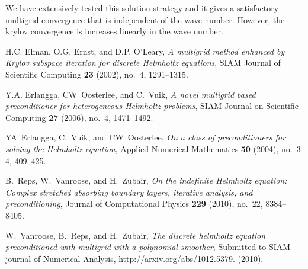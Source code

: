 \documentclass{report}
\begin{document}
We have extensively tested this solution strategy and it gives a
satisfactory multigrid convergence that is independent of the wave
number. However, the krylov convergence is increases linearly in the
wave number.


\providecommand{\bysame}{\leavevmode\hbox to3em{\hrulefill}\thinspace}
\providecommand{\MR}{\relax\ifhmode\unskip\space\fi MR }
\providecommand{\MRhref}[2]{%
\href{http://www.ams.org/mathscinet-getitem?mr=#1}{#2}
}
\providecommand{\href}[2]{#2}
\begin{thebibliography}{1}

H.C. Elman, O.G. Ernst, and D.P. O'Leary, \emph{{A multigrid method enhanced by
Krylov subspace iteration for discrete Helmholtz equations}}, SIAM Journal of
Scientific Computing \textbf{23} (2002), no.~4, 1291--1315.

Y.A. Erlangga, CW~Oosterlee, and C.~Vuik, \emph{{A novel multigrid based
preconditioner for heterogeneous Helmholtz problems}}, SIAM Journal on
Scientific Computing \textbf{27} (2006), no.~4, 1471--1492.

YA~Erlangga, C.~Vuik, and CW~Oosterlee, \emph{{On a class of preconditioners
for solving the Helmholtz equation}}, Applied Numerical Mathematics
\textbf{50} (2004), no.~3-4, 409--425.

B.~Reps, W.~Vanroose, and H.~Zubair, \emph{{On the indefinite Helmholtz
equation: Complex stretched absorbing boundary layers, iterative analysis,
and preconditioning}}, Journal of Computational Physics \textbf{229} (2010),
no.~22, 8384--8405.

W.~Vanroose, B.~Reps, and H.~Zubair, \emph{The discrete helmholtz equation
preconditioned with multigrid with a polynomial smoother}, Submitted to SIAM
journal of Numerical Analysis, http://arxiv.org/abs/1012.5379. (2010).

\end{thebibliography}
\end{document}
